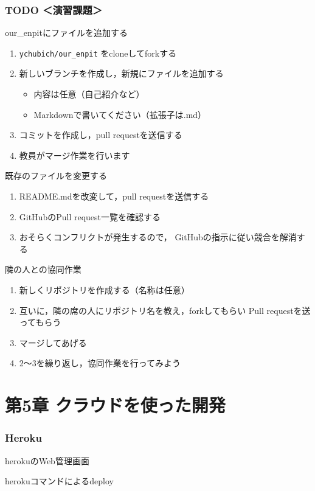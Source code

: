 \documentclass[t, aspectratio=169]{beamer}
\begin{document}
\section{{\bfseries\sffamily TODO} ＜演習課題＞}
\label{sec-4-4}
\begin{frame}[fragile,label=sec-4-4-1]{our\_enpitにファイルを追加する}
 \begin{enumerate}
\item \texttt{ychubich/our\_enpit} をcloneしてforkする
\item 新しいブランチを作成し，新規にファイルを追加する
\begin{itemize}
\item 内容は任意（自己紹介など）
\item Markdownで書いてください（拡張子は.md）
\end{itemize}
\item コミットを作成し，pull requestを送信する
\item 教員がマージ作業を行います
\end{enumerate}
\end{frame}
\begin{frame}[label=sec-4-4-2]{既存のファイルを変更する}
\begin{enumerate}
\item README.mdを改変して，pull requestを送信する
\item GitHubのPull request一覧を確認する
\item おそらくコンフリクトが発生するので，
GitHubの指示に従い競合を解消する
\end{enumerate}
\end{frame}
\begin{frame}[label=sec-4-4-3]{隣の人との協同作業}
\begin{enumerate}
\item 新しくリポジトリを作成する（名称は任意）
\item 互いに，隣の席の人にリポジトリ名を教え，forkしてもらい
Pull requestを送ってもらう
\item マージしてあげる
\item 2〜3を繰り返し，協同作業を行ってみよう
\end{enumerate}
\end{frame}
\part{第5章 クラウドを使った開発}
\label{sec-5}
\section{Heroku}
\label{sec-5-1}
\begin{frame}[label=sec-5-1-1]{herokuのWeb管理画面}
\end{frame}
\begin{frame}[label=sec-5-1-2]{herokuコマンドによるdeploy}
\end{frame}
\end{document}
